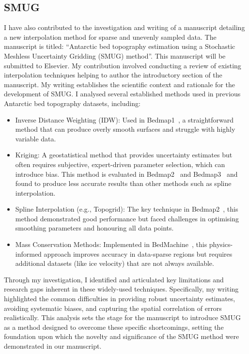 \newpage
\subsection{SMUG}
I have also contributed to the investigation and writing of a manuscript detailing a new interpolation method for sparse and unevenly sampled data. The manuscript is titled: ``Antarctic bed topography estimation using a Stochastic Meshless Uncertainty Gridding (SMUG) method''. This manuscript will be submitted to Elsevier.
My contribution involved conducting a review of existing interpolation techniques helping to author the introductory section of the manuscript. My writing establishes the scientific context and rationale for the development of SMUG. I analysed several established methods used in previous Antarctic bed topography datasets, including:

\begin{itemize}
    \item{Inverse Distance Weighting (IDW)}: Used in Bedmap1~\cite{Lythe_2001}, a straightforward method that can produce overly smooth surfaces and struggle with highly variable data.

    \item{Kriging}: A geostatistical method that provides uncertainty estimates but often requires subjective, expert-driven parameter selection, which can introduce bias. This method is evaluated in Bedmap2~\cite{Fretwell_2013} and Bedmap3~\cite{Pritchard_2025} and found to produce less accurate results than other methods such as spline interpolation.

    \item{Spline Interpolation (e.g., Topogrid)}: The key technique in Bedmap2~\cite{Fretwell_2013}, this method demonstrated good performance but faced challenges in optimising smoothing parameters and honouring all data points.

    \item{Mass Conservation Methods}: Implemented in BedMachine~\cite{Morlighem_2020}, this physics-informed approach improves accuracy in data-sparse regions but requires additional datasets (like ice velocity) that are not always available.
\end{itemize}

Through my investigation, I identified and articulated key limitations and research gaps inherent in these widely-used techniques. Specifically, my writing highlighted the common difficulties in providing robust uncertainty estimates, avoiding systematic biases, and capturing the spatial correlation of errors realistically. This analysis sets the stage for the manuscript to introduce SMUG as a method designed to overcome these specific shortcomings, setting the foundation upon which the novelty and significance of the SMUG method were demonstrated in our manuscript.

